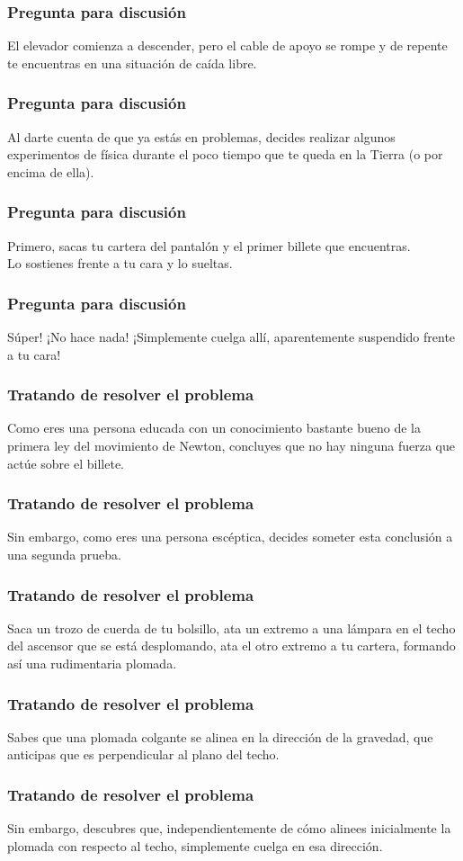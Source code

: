 \documentclass[12pt]{beamer}
\begin{document}
\begin{frame}
\frametitle{Pregunta para discusión}
El elevador comienza a descender, pero el cable de apoyo se rompe y de repente te encuentras en una situación de caída libre.
\end{frame}
\begin{frame}
\frametitle{Pregunta para discusión}
Al darte cuenta de que ya estás en problemas, \pause decides realizar algunos experimentos de física durante el poco tiempo que te queda en la Tierra (o por encima de ella).
\end{frame}
\begin{frame}
\frametitle{Pregunta para discusión}
Primero, \pause sacas tu cartera del pantalón y el primer billete que encuentras.
\\
\bigskip
\pause
Lo sostienes frente a tu cara y lo sueltas.
\end{frame}
\begin{frame}
\frametitle{Pregunta para discusión}
Súper! \pause ¡No hace nada! \pause ¡Simplemente cuelga allí, aparentemente suspendido frente a tu cara!
\end{frame}
\begin{frame}
\frametitle{Tratando de resolver el problema}
Como eres una persona educada con un conocimiento bastante bueno de la primera ley del movimiento de Newton, concluyes que no hay ninguna fuerza que actúe sobre el billete.
\end{frame}
\begin{frame}
\frametitle{Tratando de resolver el problema}
Sin embargo, como eres una persona escéptica, \pause decides someter esta conclusión a una segunda prueba.
\end{frame}
\begin{frame}
\frametitle{Tratando de resolver el problema}
Saca un trozo de cuerda de tu bolsillo, ata un extremo a una lámpara en el techo del ascensor que se está desplomando, \pause ata el otro extremo a tu cartera, formando así una rudimentaria plomada.
\end{frame}
\begin{frame}
\frametitle{Tratando de resolver el problema}
Sabes que una plomada colgante se alinea en la dirección de la gravedad, que anticipas que es perpendicular al plano del techo.
\end{frame}
\begin{frame}
\frametitle{Tratando de resolver el problema}
Sin embargo, descubres que, independientemente de cómo alinees inicialmente la plomada con respecto al techo, simplemente cuelga en esa dirección.
\end{frame}
\end{document}
